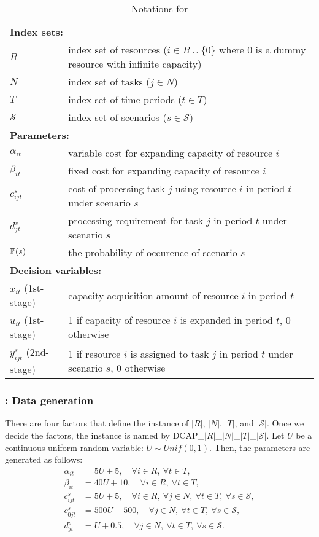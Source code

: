 \begin{table}[H]
	\caption{Notations for \dcap}
	\label{dcap:notation}
	\resizebox{\textwidth}{!}
	{
		\begin{tabular}{ll}
			\toprule
			\multicolumn{2}{l}{\textbf{Index sets:}} \\
			$R$ & index set of resources ($i\in R\cup\{0\}$ where $0$ is a dummy resource with infinite capacity) \\ 
			$N$ & index set of tasks ($j\in N$)\\ 
			$T$ & index set of time periods ($t\in T$)\\
			$\mathcal{S}$ & index set of scenarios ($s\in \mathcal{S}$) \\ \midrule
			\multicolumn{2}{l}{\textbf{Parameters:}} \\
			$\alpha_{it}$ & variable cost for expanding capacity of resource $i$\\ 
			$\beta_{it}$ & fixed cost for expanding capacity of resource $i$ \\ 
			$c_{ijt}^{s}$ & cost of processing task $j$ using resource $i$ in period $t$ under scenario $s$ \\ 
			$d_{jt}^s$	& processing requirement for task $j$ in period $t$ under scenario $s$		\\
			$\operatorname*{\mathbb{P}}(s)$ & \textrm{the probability of occurence of scenario $s$} \\ \midrule
			\multicolumn{2}{l}{\textbf{Decision variables:}} \\
			$x_{it}$ (1st-stage) & capacity acquisition amount of resource $i$ in period $t$ \\ 
			$u_{it}$ (1st-stage)& 1 if capacity of resource $i$ is expanded in period $t$, 0 otherwise \\ 
			$y_{ijt}^s$ (2nd-stage)& 1 if resource $i$ is assigned to task $j$ in period $t$ under scenario $s$, 0 otherwise\\
			\bottomrule
		\end{tabular}
	}
\end{table} 

\subsubsection{\dcap: Data generation} 
There are four factors that define the instance of \dcap\: $|R|$, $|N|$, $|T|$, and $|\mathcal{S}|$. Once we decide the factors, the instance is named by DCAP\_$|R|$\_$|N|$\_$|T|$\_$|\mathcal{S}|$. Let $U$ be a continuous uniform random variable: $U\sim Unif(0,1)$. Then, the parameters are generated as follows:
\begin{align*}
	\alpha_{it}&=5U+5,\quad\forall i\in R,\ \forall t\in T, \\
	\beta_{it} &=40U+10,\quad\forall i\in R,\ \forall t\in T, \\
	c_{ijt}^s  &=5U+5,\quad\forall i\in R,\ \forall j\in N,\ \forall t\in T,\ \forall s\in\mathcal{S}, \\
	c_{0jt}^s  &=500U+500,\quad\forall j\in N,\ \forall t\in T,\ \forall s\in\mathcal{S}, \\
	d_{jt}^s   &=U+0.5,\quad\forall j\in N,\ \forall t\in T,\ \forall s\in\mathcal{S}.
\end{align*}

